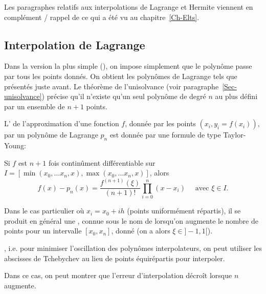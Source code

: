 Les paragraphes relatifs aux interpolations de Lagrange et Hermite viennent en complément / rappel 
de ce qui a été vu au chapitre~\ref{Ch-Elts}.

\medskip
\subsection{Interpolation de Lagrange}

Dans la version la plus simple (), on impose simplement que le 
polynôme passe par tous les points donnés. 
On obtient les polynômes de Lagrange tels que présentés juste avant.
Le théorème de l'unisolvance (voir paragraphe~\ref{Sec-unisolvance}) précise qu'il n'existe qu'un seul 
polynôme de degré $n$ au plus défini par un ensemble de $n+1$ points.

\medskip
L' de l'approximation d'une fonction $f$, donnée par les points 
$(x_i,y_i=f(x_i))$, par un polynôme de Lagrange $p_n$ est donnée par une formule de type 
Taylor-Young:

Si $f$ est $n+1$ fois continûment différentiable sur $I=[\min(x_0,...x_n,x),\max(x_0,...x_n,x)]$, alors
\begin{equation}
    f(x) - p_n(x) = \frac{f^{(n+1)}(\xi)}{(n+1)!} \prod_{i=0}^n (x-x_i) \quad \text{ avec } \xi \in I.
\end{equation}

\medskip
Dans le cas particulier où $x_i = x_0 + ih$ (points uniformément répartis), il se produit en général 
une , connue sous le nom de 
lorsqu'on augmente le nombre de points pour un intervalle $[x_0,x_n]$, donné (on a alors $\xi\in]-1,1[$).

\medskip
{}, i.e. 
pour minimiser l'oscillation des polynômes interpolateurs, on peut utiliser les abscisses de 
Tchebychev au lieu de points 
équirépartis pour interpoler. 

Dans ce cas, on peut montrer que l'erreur d'interpolation décroît lorsque $n$ augmente.

